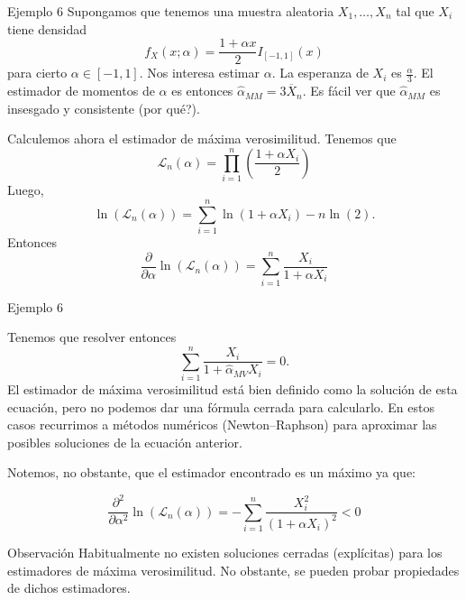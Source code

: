 \documentclass{beamer}
\theoremstyle{definition}
\begin{document}
\begin{frame}{\color{rosee}Ejemplo 6}
  \small
    Supongamos que tenemos una muestra aleatoria $X_{1},\dots,X_{n}$ tal
    que $X_{i}$ tiene densidad
    $$
    f_{X}(x;\alpha)=\frac{1+\alpha x}{2} I_{[-1,1]}(x)
    $$
    para cierto $\alpha\in [-1, 1]$. Nos interesa estimar $\alpha$. La
    esperanza de $X_{i}$ es $\frac{\alpha}{3}$. El estimador de momentos
    de $\alpha$ es entonces $\widehat{\alpha}_{MM}=3
    \overline{X}_{n}$.
    Es f\'acil ver que $\widehat{\alpha}_{MM}$ es insesgado y
    consistente (por qu\'e?).


    Calculemos ahora el estimador de m\'axima verosimilitud. Tenemos que
    $$
    \mathcal{L}_{n}(\alpha)=\prod_{i=1}^{n} \left(\frac{1+\alpha
        X_{i}}{2}\right)
    $$
    Luego,
    $$
    \ln(\mathcal{L}_{n}(\alpha))=\sum_{i=1}^{n} \ln\left({1+\alpha
        X_{i}}\right) -n\ln(2) .
    $$
Entonces $$\frac{\partial }{\partial \alpha}\ln(\mathcal{L}_{n}(\alpha))=\sum_{i=1}^{n}
    \frac{X_i}{1+\alpha X_{i}}$$
\end{frame}

\begin{frame}{\color{rosee}Ejemplo 6} \small
  
    Tenemos que resolver entonces
    $$
    \sum_{i=1}^{n}
    \frac{X_i}{1+\widehat{\alpha}_{MV} X_{i}}=0.
    $$
El estimador de m\'axima verosimilitud est\'a bien definido como la
    soluci\'on de esta ecuaci\'on, pero no podemos dar una f\'ormula
    cerrada para calcularlo. En estos casos recurrimos a métodos num\'ericos (Newton--Raphson) para aproximar las posibles soluciones de la ecuaci\'on anterior.

    Notemos, no obstante, que el estimador encontrado es un máximo ya que:

    $$\frac{\partial^2 }{\partial \alpha^2}\ln(\mathcal{L}_{n}(\alpha))=-\sum_{i=1}^{n}
    \frac{X_i^2}{(1+\alpha X_{i})^2}<0$$
  
  \begin{alertblock}{\color{rosee}Observaci\'on}
    Habitualmente no existen soluciones cerradas (explícitas) para los estimadores de m\'axima
    verosimilitud. No obstante, se pueden probar propiedades de dichos estimadores.
  \end{alertblock}
\end{frame}
\end{document}
